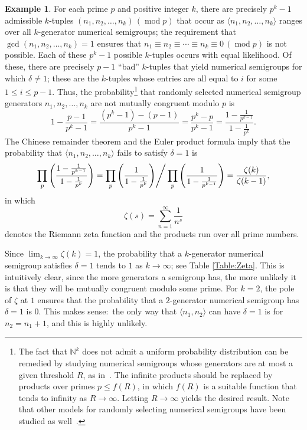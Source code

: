 \documentclass[10pt,reqno]{amsart}
\newcommand{\NN}{\mathbb{N}}
\newcommand{\0}{\color{lightgray}0}
\renewcommand{\pmod}[1]{\,(\operatorname{mod} #1)}
\renewcommand\>{\rangle}
\newcommand\<{\langle}
\theoremstyle{plain}
\theoremstyle{definition}
\newtheorem{Example}[equation]{Example}
\begin{document}
\begin{Example} 
For each prime $p$ and positive integer $k$, there are precisely $p^k-1$ admissible $k$-tuples 
$(n_1,n_2,\ldots,n_k) \pmod{p}$
that occur as $\<n_1,n_2,\ldots,n_k\>$ ranges over all $k$-generator numerical semigroups;
the requirement that $\gcd(n_1,n_2,\ldots,n_k) = 1$ ensures that $n_1 \equiv n_2 \equiv \cdots \equiv n_k \equiv 0 \pmod{p}$ is not possible.
Each of these $p^k-1$ possible $k$-tuples occurs with equal likelihood.  Of these, there are precisely $p-1$ ``bad'' $k$-tuples that yield numerical semigroups for which $\delta \ne 1$; these are the $k$-tuples whose entries are all equal to $i$ for some $1 \leq i \leq p-1$.  Thus, the probability\footnote{The fact that $\NN^k$ does not admit a uniform probability distribution can be remedied by studying numerical semigroups whose generators are at most a given threshold $R$, as in~\cite{arnold,bourgainsinai}.  The infinite products should be replaced by products over primes $p\leq f(R)$, in which $f(R)$ is a suitable function that tends to infinity as $R \to \infty$.  Letting $R \to \infty$ yields the desired result.  Note that other models for randomly selecting numerical semigroups have been studied as well~\cite{RNS}.}
that randomly selected numerical semigroup generators $n_1,n_2,\ldots,n_k$ are not mutually congruent modulo $p$ is
\begin{equation*}
1 - \frac{p-1}{p^k-1} = \frac{(p^k-1)-(p-1)}{p^k-1} = \frac{p^k-p}{p^k-1} = \frac{1 - \frac{1}{p^{k-1} }}{1 - \frac{1}{p^k}}.
\end{equation*}
The Chinese remainder theorem and the Euler product formula 
imply that the probability that
$\<n_1,n_2,\ldots,n_k\>$ fails to satisfy $\delta = 1$ is
\begin{equation*}
\prod_p \Bigg(\frac{1 - \frac{1}{p^{k-1} }}{1 - \frac{1}{p^k}} \Bigg)
= \prod_p \Bigg( \frac{1}{1 - \frac{1}{p^k}} \Bigg) \Bigg\slash\prod_p \Bigg( \frac{1}{1 - \frac{1}{p^{k-1}}} \Bigg) \\
= \frac{ \zeta(k)}{\zeta(k-1)},
\end{equation*}
in which 
\begin{equation*}
\zeta(s) = \sum_{n=1}^{\infty} \frac{1}{n^s}
\end{equation*}
denotes the Riemann zeta function and the products run over all prime numbers.

Since $\lim_{k\to\infty} \zeta(k) = 1$, the probability that a $k$-generator
numerical semigroup satisfies $\delta = 1$ tends to $1$ as $k\to \infty$; see Table \ref{Table:Zeta}.  This is intuitively clear, since the more generators a semigroup has, the more unlikely it is that they will be mutually congruent modulo some prime.  For $k=2$, the pole of $\zeta$ at $1$ ensures that the probability that a $2$-generator numerical semigroup has $\delta = 1$ is $0$.  This makes sense:\ the only way that $\<n_1,n_2\>$ can have $\delta = 1$ is for $n_2 = n_1+1$, and this is highly unlikely.      
\end{Example}
\end{document}

